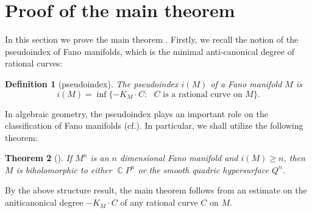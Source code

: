 \documentclass[11pt]{amsart}
\theoremstyle{plain}
\newtheorem{thm}{Theorem}[section]
\newtheorem{defn}[thm]{Definition}
\theoremstyle{definition}
\numberwithin{equation}{section}
\DeclareMathOperator{\C}{\mathbb{C}}
\begin{document}
\section{Proof of the main theorem}\label{Sec:Proof}

In this section we prove the main theorem . Firstly, we recall the notion of the pseudoindex of Fano manifolds, which is the minimal anti-canonical degree of rational curves:
\begin{defn}[pseudoindex]
    The \emph{pseudoindex} $i(M)$ of a Fano manifold $M$ is 
    \begin{equation}
        i(M)=\inf\{-K_M\cdot C:\text{ $C$ is a rational curve on $M$}\}.
    \end{equation}
\end{defn}

In algebraic geometry, the pseudoindex plays an important role on the classification of Fano manifolds (cf.\cite{CMSB02,Miy04,DH17}). In particular, we shall utilize the following theorem:
\begin{thm}[\cite{Miy04,DH17}]
    If $M^n$ is an $n$ dimensional Fano manifold and $i(M)\ge n$, then $M$ is biholomorphic to either $\C P^{n}$ or the smooth quadric hypersurface $Q^n$.
\end{thm}

By the above structure result, the main theorem follows from an estimate on the aniticanonical degree $-K_M\cdot C$ of any rational curve $C$ on $M$. 
\end{document}
